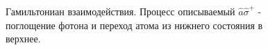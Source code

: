 \begin{figure}
\centering



\caption{Гамильтониан взаимодействия. Процесс описываемый $\hat{a}\hat{\sigma}^{+}$ - поглощение
  фотона и переход атома из нижнего состояния в верхнее.}
\label{figPart1Ch2_2_2}
\end{figure}
